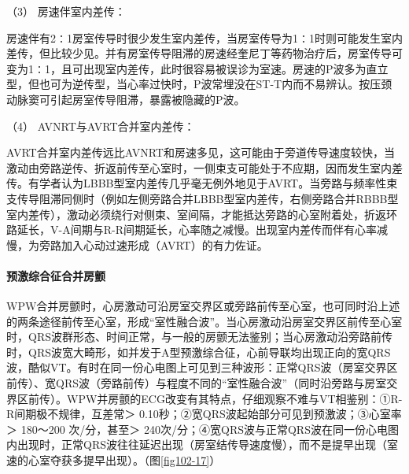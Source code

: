 \hypertarget{text00295.htmlux5cux23CHP10-2-8-2-2-5-3}{}
（3） 房速伴室内差传：

房速伴有2∶1房室传导时很少发生室内差传，当房室传导为1∶1时则可能发生室内差传，但比较少见。并有房室传导阻滞的房速经奎尼丁等药物治疗后，房室传导可变为1∶1，且可出现室内差传，此时很容易被误诊为室速。房速的P波多为直立型，但也可为逆传型，当心率过快时，P波常埋没在ST-T内而不易辨认。按压颈动脉窦可引起房室传导阻滞，暴露被隐藏的P波。

\hypertarget{text00295.htmlux5cux23CHP10-2-8-2-2-5-4}{}
（4） AVNRT与AVRT合并室内差传：

AVRT合并室内差传远比AVNRT和房速多见，这可能由于旁道传导速度较快，当激动由旁路逆传、折返前传至心室时，一侧束支可能处于不应期，因而发生室内差传。有学者认为LBBB型室内差传几乎毫无例外地见于AVRT。当旁路与频率性束支传导阻滞同侧时（例如左侧旁路合并LBBB型室内差传，右侧旁路合并RBBB型室内差传），激动必须绕行对侧束、室间隔，才能抵达旁路的心室附着处，折返环路延长，V-A间期与R-R间期延长，心率随之减慢。出现室内差传而伴有心率减慢，为旁路加入心动过速形成（AVRT）的有力佐证。

\paragraph{预激综合征合并房颤}

WPW合并房颤时，心房激动可沿房室交界区或旁路前传至心室，也可同时沿上述的两条途径前传至心室，形成“室性融合波”。当心房激动沿房室交界区前传至心室时，QRS波群形态、时间正常，与一般的房颤无法鉴别；当心房激动沿旁路前传时，QRS波宽大畸形，如并发于A型预激综合征，心前导联均出现正向的宽QRS波，酷似VT。有时在同一份心电图上可见到三种波形：正常QRS波（房室交界区前传）、宽QRS波（旁路前传）与程度不同的“室性融合波”（同时沿旁路与房室交界区前传）。WPW并房颤的ECG改变有其特点，仔细观察不难与VT相鉴别：①R-R间期极不规律，互差常＞
0.10秒；②宽QRS波起始部分可见到预激波；③心室率＞ 180～200 次/分，甚至＞
240次/分；④宽QRS波与正常QRS波在同一份心电图内出现时，正常QRS波往往延迟出现（房室结传导速度慢），而不是提早出现（室速的心室夺获多提早出现）。（图\ref{fig102-17}）

